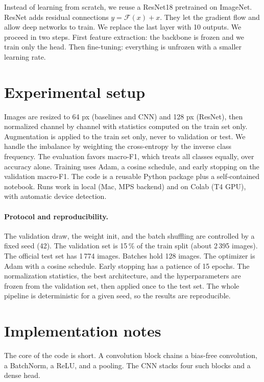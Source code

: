 \documentclass[11pt,a4paper]{article}
\begin{document}
Instead of learning from scratch, we reuse a ResNet18 pretrained on ImageNet. ResNet adds
residual connections $y = \mathcal{F}(x)+x$. They let the gradient flow and allow deep
networks to train. We replace the last layer with 10 outputs. We proceed in two steps. First
feature extraction: the backbone is frozen and we train only the head. Then fine-tuning:
everything is unfrozen with a smaller learning rate.

\section{Experimental setup}

Images are resized to 64 px (baselines and CNN) and 128 px (ResNet), then normalized channel
by channel with statistics computed on the train set only. Augmentation is applied to the
train set only, never to validation or test. We handle the imbalance by weighting the
cross-entropy by the inverse class frequency. The evaluation favors macro-F1, which treats
all classes equally, over accuracy alone. Training uses Adam, a cosine schedule, and early
stopping on the validation macro-F1. The code is a reusable Python package plus a
self-contained notebook. Runs work in local (Mac, MPS backend) and on Colab (T4 GPU), with
automatic device detection.

\paragraph{Protocol and reproducibility.} The validation draw, the weight init, and the batch
shuffling are controlled by a fixed seed (42). The validation set is 15\,\% of the train
split (about 2\,395 images). The official test set has 1\,774 images. Batches hold 128
images. The optimizer is Adam with a cosine schedule. Early stopping has a patience of 15
epochs. The normalization statistics, the best architecture, and the hyperparameters are
frozen from the validation set, then applied once to the test set. The whole pipeline is
deterministic for a given seed, so the results are reproducible.

\section{Implementation notes}

The core of the code is short. A convolution block chains a bias-free convolution, a
BatchNorm, a ReLU, and a pooling. The CNN stacks four such blocks and a dense head.
\end{document}
